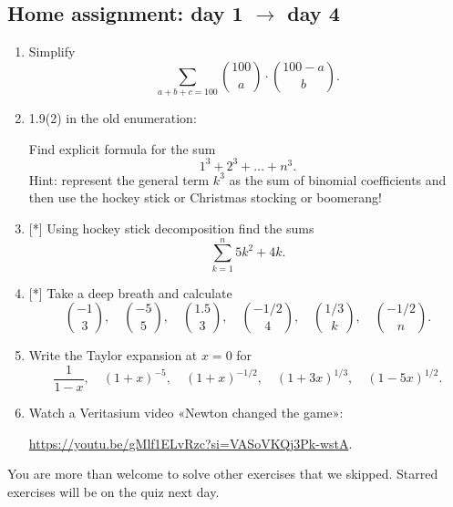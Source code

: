\documentclass[12pt]{article}
\begin{document}





\subsection*{Home assignment: day 1 $\to$ day 4}

\begin{enumerate}
    \item Simplify
\[
\sum_{a + b + c = 100} {100 \choose a} \cdot {100-a \choose b}.
\]
    \item 1.9(2) in the old enumeration:

    Find explicit formula for the sum 
    \[
    1^3 + 2^3 + \dots + n^3.
    \]
    Hint: represent the general term $k^3$ as the sum of binomial coefficients and then use the hockey stick or Christmas stocking or boomerang!

    \item  {[*]} Using hockey stick decomposition find the sums
    \[
    \sum_{k=1}^{n} {5k^2 + 4k}.
    \]

    \item {[*]} Take a deep breath and calculate 
\[
{-1 \choose 3}, \quad {-5 \choose 5},\quad  {1.5 \choose 3}, \quad  
{-1/2 \choose 4}, \quad  {1/3 \choose k}, \quad  {-1/2 \choose n}. 
\]

    \item Write the Taylor expansion at $x = 0$ for 
\[
\frac{1}{1 - x}, \quad  (1 + x)^{-5}, \quad  (1 + x)^{-1/2}, \quad  
(1 + 3x)^{1/3}, \quad  (1 - 5x)^{1/2}.
\]

    \item Watch a Veritasium video «Newton changed the game»:

    \url{https://youtu.be/gMlf1ELvRzc?si=VASoVKQj3Pk-wstA}.
\end{enumerate}

You are more than welcome to solve other exercises that we skipped. Starred exercises will be on the quiz next day. 
\end{document}
